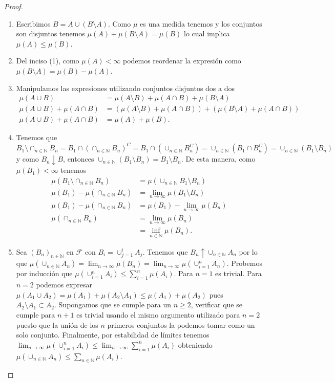 \documentclass{article}
\theoremstyle{definition}
\theoremstyle{remark}
\newcommand{\BN}{\mathbb N}
\begin{document}
\begin{proof}
  \begin{enumerate}
    \item Escribimos $B = A \cup (B \setminus A)$. Como $\mu$ es una medida tenemos y los conjuntos son disjuntos tenemos
      $\mu(A) + \mu(B \setminus A) = \mu(B)$ lo cual implica $\mu(A) \leq \mu(B)$.
    \item Del inciso (1), como $\mu(A) < \infty$ podemos reordenar la expresi\'on como $\mu(B \setminus A) = \mu(B) - \mu(A)$.
    \item Manipulamos las expresiones utilizando conjuntos disjuntos dos a dos
      \begin{align*}
        \mu(A \cup B) &= \mu(A \setminus B) + \mu(A \cap B) + \mu(B \setminus A)\\
        \mu(A \cup B) + \mu(A \cap B) &= (\mu(A \setminus B) + \mu(A \cap B)) + (\mu(B \setminus A) + \mu(A \cap B))\\
        \mu(A \cup B) + \mu(A \cap B) &= \mu(A) + \mu(B).
      \end{align*}
    \item Tenemos que $B_1 \setminus \cap_{n \in \BN} B_n = B_1 \cap (\cap_{n \in \BN} B_n)^C = B_1 \cap (\cup_{n \in \BN} B_n^C) = \cup_{n \in \BN} (B_1 \cap B_n^C) = \cup_{n \in \BN} (B_1 \setminus B_n)$ y como $B_n \downarrow B$, entonces $\cup_{n \in \BN} (B_1 \setminus B_n) = B_1 \setminus B_n$.
      De esta manera, como $\mu(B_1) < \infty$ tenemos
      \begin{align*}
        \mu(B_1 \setminus \cap_{n \in \BN} B_n) &= \mu(\cup_{n \in \BN} B_1 \setminus B_n)\\
        \mu(B_1) - \mu(\cap_{n \in \BN} B_n) &= \lim_{n \to \infty} \mu(B_1 \setminus B_n)\\
        \mu(B_1) - \mu(\cap_{n \in \BN} B_n) &= \mu(B_1) - \lim_{n \to \infty} \mu(B_n)\\
        \mu(\cap_{n \in \BN} B_n) &= \lim_{n \to \infty} \mu(B_n)\\
        &= \inf_{n \in \BN} \mu(B_n).
      \end{align*}
    \item Sea $(B_n)_{n \in \BN}$ en $\mathcal{F}$ con $B_i = \cup_{j = 1}^i A_j$.
      Tenemos que $B_n \uparrow \cup_{n \in \BN} A_n$ por lo que $\mu(\cup_{n \in \BN} A_n) = \lim_{n \to \infty} \mu(B_n) = \lim_{n \to \infty} \mu(\cup_{i = 1}^n A_n)$.
      Probemos por inducci\'on que $\mu(\cup_{i = 1}^n A_i) \leq \sum_{i = 1}^n \mu(A_i)$. Para $n = 1$ es trivial.
      Para $n = 2$ podemos expresar $\mu(A_1 \cup A_2) = \mu(A_1) + \mu(A_2 \setminus A_1) \leq \mu(A_1) + \mu(A_2)$ pues $A_2 \setminus A_1 \subset A_2$.
      Supongamos que se cumple para un $n \geq 2$, verificar que se cumple para $n + 1$ es trivial usando el mismo argumento utilizado para $n = 2$ puesto que la uni\'on de los $n$ primeros conjuntos la podemos tomar como un solo conjunto.
      Finalmente, por estabilidad de l\'imites tenemos $\lim_{n \to \infty} \mu(\cup_{i = 1}^n A_i) \leq \lim_{n \to \infty} \sum_{i = 1}^n \mu(A_i)$ obteniendo $\mu(\cup_{n \in \BN} A_n) \leq \sum_{n \in \BN} \mu(A_i)$.
  \end{enumerate}
\end{proof}
\end{document}
